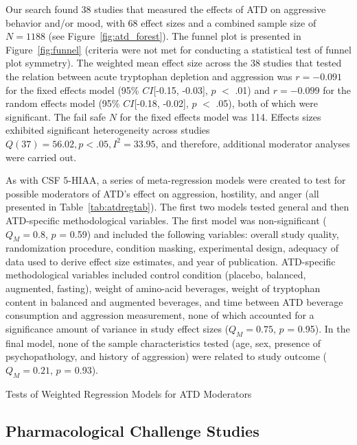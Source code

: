 \documentclass[man]{apa6}\usepackage{graphicx, color}
\begin{document}
Our search found 38 studies that measured the effects of ATD on aggressive behavior and\slash or mood, with 68 effect sizes and a combined sample size of $N = 1188$ (see Figure~\ref{fig:atd_forest}). The funnel plot is presented in Figure~\ref{fig:funnel} (criteria were not met for conducting a statistical test of funnel plot symmetry). The weighted mean effect size across the 38 studies that tested the relation between acute tryptophan depletion and aggression was $r = -0.091$ for the fixed effects model (95\% $CI$[-0.15, -0.03], $p$ $<$ .01) and $r = -0.099$ for the random effects model (95\% $CI$[-0.18, -0.02], $p$ $<$ .05), both of which were significant. The fail safe $N$ for the fixed effects model was 114. Effects sizes exhibited significant heterogeneity across studies \ensuremath{Q(37) = 56.02, p < .05, I^2 = 33.95}, and therefore, additional moderator analyses were carried out.


As with CSF 5-HIAA, a series of meta-regression models were created to test for possible moderators of ATD's effect on aggression, hostility, and anger (all presented in Table~\ref{tab:atdregtab}). The first two models tested general and then ATD-specific methodological variables. The first model was non-significant ($Q_M = 0.8$, $p$ = 0.59) and included the following variables: overall study quality, randomization procedure, condition masking, experimental design, adequacy of data used to derive effect size estimates, and year of publication. ATD-specific methodological variables included control condition (placebo, balanced, augmented, fasting), weight of amino-acid beverages, weight of tryptophan content in balanced and augmented beverages, and time between ATD beverage consumption and aggression measurement, none of which accounted for a significance amount of variance in study effect sizes ($Q_M = 0.75$, $p$ = 0.95). In the final model, none of the sample characteristics tested (age, sex, presence of psychopathology, and history of aggression) were related to study outcome ($Q_M = 0.21$, $p$ = 0.93).


\begin{table*}[h]
\centering
\caption{Tests of Weighted Regression Models for ATD Moderators}
\label{tab:atdregtab}
\footnotesize{}
\end{table*}


\subsection{Pharmacological Challenge Studies}
\end{document}
